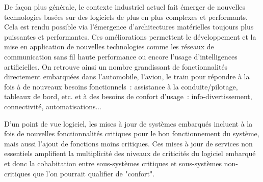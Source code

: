 \documentclass[french, a4paper, 11pt, twoside, pdftex]{StyleThese}
\begin{document}
		De façon plus générale, le contexte industriel actuel fait émerger de nouvelles technologies basées sur des logiciels de plus en plus complexes et performants. Cela est rendu possible via l'émergence d'architectures matérielles toujours plus puissantes et performantes. Ces améliorations permettent le développement et la mise en application de nouvelles technologies comme les réseaux de communication sans fil haute performance ou encore l'usage d'intelligences artificielles. On retrouve ainsi un nombre grandissant de fonctionnalités directement embarquées dans l'automobile, l'avion, le train pour répondre à la fois à de nouveaux besoins fonctionnels~: assistance à la conduite/pilotage, tableaux de bord, etc. et à des besoins de confort d'usage~: info-divertissement, connectivité, automatisations...
		
		
		D'un point de vue logiciel, les mises à jour de systèmes embarqués incluent à la fois de nouvelles fonctionnalités critiques pour le bon fonctionnement du système, mais aussi l'ajout de fonctions moins critiques. Ces mises à jour de services non essentiels amplifient  la multiplicité des niveaux de criticités du logiciel embarqué et donc la cohabitation entre sous-systèmes critiques et sous-systèmes non-critiques que l'on pourrait qualifier de "confort".
		
\end{document}
